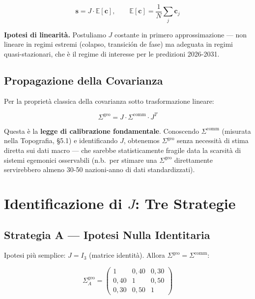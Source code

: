 \[
\mathbf{s} = J \cdot \mathbb{E}[\mathbf{c}], \qquad \mathbb{E}[\mathbf{c}] = \frac{1}{N}\sum_j \mathbf{c}_j
\]

\Hypoth{} \textbf{Ipotesi di linearità.} Postuliamo \(J\) costante in
primero approssimazione --- non lineare in regimi estremi (colapso,
transición de fase) ma adeguata in regimi quasi-stazionari, che è il
regime di interesse per le predizioni 2026-2031.

\subsection{Propagazione della
Covarianza}\label{propagazione-della-covarianza}

Per la proprietà classica della covarianza sotto trasformazione lineare:

\[
\boxed{\Sigma^{\text{geo}} = J \cdot \Sigma^{\text{comm}} \cdot J^T}
\]

Questa è la \textbf{legge di calibrazione fondamentale}. Conoscendo
\(\Sigma^{\text{comm}}\) (misurata nella Topografia, \S{}5.1) e
identificando \(J\), obtenemos \(\Sigma^{\text{geo}}\) senza necessità
di stima diretta sui dati macro --- che sarebbe statisticamente fragile
data la scarsità di sistemi egemonici osservabili (n.b.~per stimare una
\(\Sigma^{\text{geo}}\) direttamente servirebbero almeno 30-50
nazioni-anno di dati standardizzati).



\section{\texorpdfstring{Identificazione di \(J\): Tre
Strategie}{Identificazione di J: Tre Strategie}}\label{identificazione-di-j-tre-strategie}

\subsection{Strategia A --- Ipotesi Nulla
Identitaria}\label{strategia-a-hipótesis-nulla-identitaria}

Ipotesi più semplice: \(J = I_3\) (matrice identità). Allora
\(\Sigma^{\text{geo}} = \Sigma^{\text{comm}}\):

\[
\Sigma^{\text{geo}}_A = \begin{pmatrix} 1 & 0{,}40 & 0{,}30 \\ 0{,}40 & 1 & 0{,}50 \\ 0{,}30 & 0{,}50 & 1 \end{pmatrix}
\]

